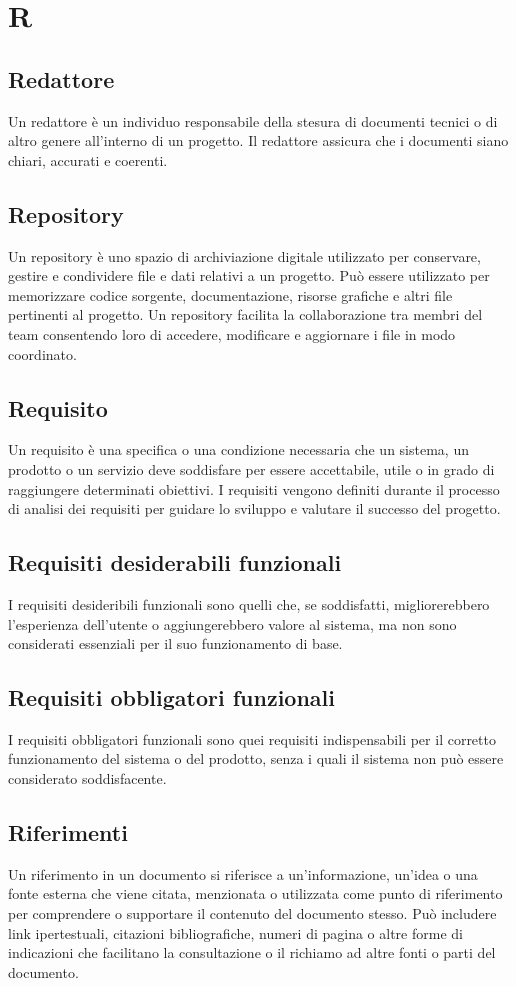 \section{R} 
\subsection{Redattore} 
Un redattore è un individuo responsabile della stesura di documenti tecnici o di altro genere all'interno di un progetto. Il redattore assicura che i documenti siano chiari, accurati e coerenti. 
\subsection{Repository} 
Un repository è uno spazio di archiviazione digitale utilizzato per conservare, gestire e condividere file e dati relativi a un progetto. Può essere utilizzato per memorizzare codice sorgente, documentazione, risorse grafiche e altri file pertinenti al progetto. Un repository facilita la collaborazione tra membri del team consentendo loro di accedere, modificare e aggiornare i file in modo coordinato. 
\subsection{Requisito} 
Un requisito è una specifica o una condizione necessaria che un sistema, un prodotto o un servizio deve soddisfare per essere accettabile, utile o in grado di raggiungere determinati obiettivi. I requisiti vengono definiti durante il processo di analisi dei requisiti per guidare lo sviluppo e valutare il successo del progetto. 
\subsection{Requisiti desiderabili funzionali} 
I requisiti desideribili funzionali sono quelli che, se soddisfatti, migliorerebbero l'esperienza dell'utente o aggiungerebbero valore al sistema, ma non sono considerati essenziali per il suo funzionamento di base. 
\subsection{Requisiti obbligatori funzionali} 
I requisiti obbligatori funzionali sono quei requisiti indispensabili per il corretto funzionamento del sistema o del prodotto, senza i quali il sistema non può essere considerato soddisfacente. 
\subsection{Riferimenti} 
Un riferimento in un documento si riferisce a un'informazione, un'idea o una fonte esterna che viene citata, menzionata o utilizzata come punto di riferimento per comprendere o supportare il contenuto del documento stesso. Può includere link ipertestuali, citazioni bibliografiche, numeri di pagina o altre forme di indicazioni che facilitano la consultazione o il richiamo ad altre fonti o parti del documento. 
